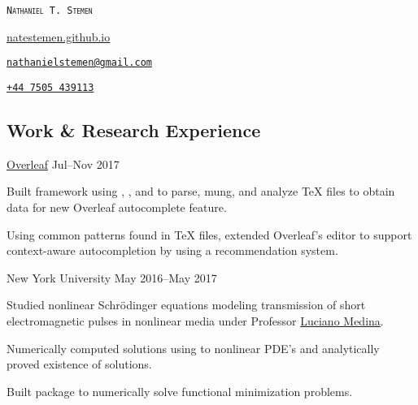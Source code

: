 \documentclass{cultvoucher}
\begin{document}
\begin{flushleft}
    {\Huge{\textsc{\texttt{Nathaniel T. Stemen}}}}
    
    {\url{natestemen.github.io}}

    {\href{mailto:nathanielstemen@gmail.com}{\nolinkurl{nathanielstemen@gmail.com}}}

    \href{tel:447505439113}{\texttt{+44\,7505\,439113}}
\end{flushleft}

\vspace{-10pt}

\begin{paracol}{2}

\section{Work \& Research Experience}

         {\href{https://www.overleaf.com/}{Overleaf}}
         {Jul--Nov 2017}
\begin{tightitemize}
    \item Built framework using , , and  to parse, mung, and analyze \TeX{} files to obtain data for new Overleaf autocomplete feature.
    \item Using common patterns found in \TeX{} files, extended Overleaf's editor to support context-aware autocompletion by using a recommendation system.
\end{tightitemize}

         {New York University}
         {May 2016--May 2017}
\begin{tightitemize}
	\item Studied nonlinear Schr\"{o}dinger equations modeling transmission of short electromagnetic pulses in nonlinear media under Professor \href{https://www.sites.google.com/a/nyu.edu/luciano-medina/}{Luciano Medina}.
	\item Numerically computed solutions using  to nonlinear PDE's and analytically proved existence of solutions.
	\item Built package to numerically solve functional minimization problems.
\end{tightitemize}


\end{paracol}
\end{document}

